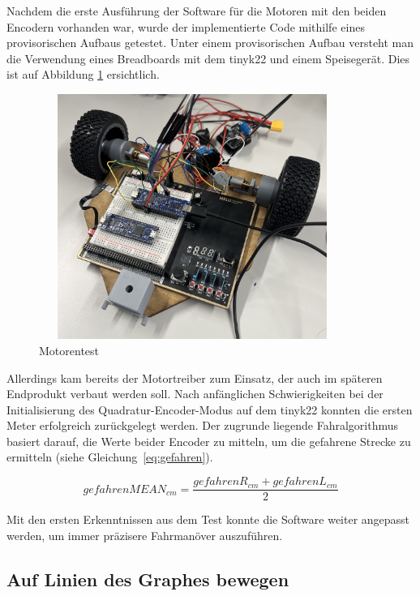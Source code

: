 Nachdem die erste Ausführung der Software für die Motoren mit den beiden Encodern vorhanden war, wurde der implementierte Code mithilfe eines provisorischen Aufbaus getestet. Unter einem provisorischen Aufbau versteht man die Verwendung eines Breadboards mit dem \gls{tinyk22} und einem Speisegerät. Dies ist auf Abbildung \ref{fig: Motorentest} ersichtlich.

\begin{figure}[H]
\centering
\includegraphics[width=10cm, height=8cm]{assets/ET/Motoren/Motorentest.jpeg}
\caption{Motorentest}
\label{fig: Motorentest}
\end{figure}


Allerdings kam bereits der Motortreiber zum Einsatz, der auch im späteren Endprodukt verbaut werden soll. Nach anfänglichen Schwierigkeiten bei der Initialisierung des Quadratur-Encoder-Modus auf dem \gls{tinyk22} konnten die ersten Meter erfolgreich zurückgelegt werden. Der zugrunde liegende Fahralgorithmus basiert darauf, die Werte beider Encoder zu mitteln, um die gefahrene Strecke zu ermitteln (siehe Gleichung~\ref{eq:gefahren}).

\begin{equation}
    gefahrenMEAN_{cm} = \frac{gefahrenR_{cm} + gefahrenL_{cm}} {2} 
    \label{eq:gefahren}
\end{equation}

Mit den ersten Erkenntnissen aus dem Test konnte die Software weiter angepasst werden, um immer präzisere Fahrmanöver auszuführen. 





\subsection{Auf Linien des Graphes bewegen}
\label{Auf Linien des Graphes bewegen}

